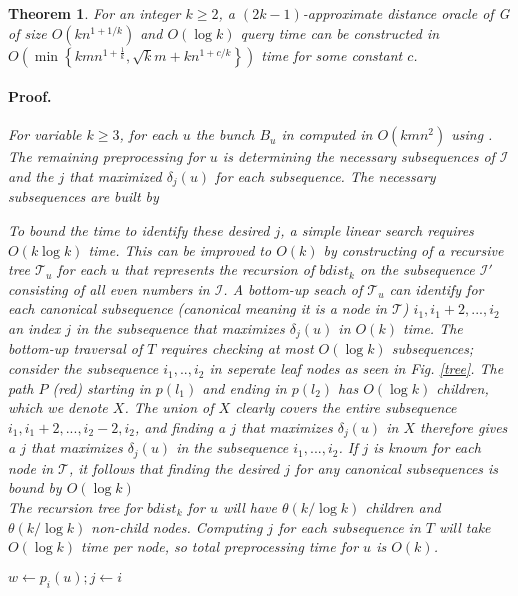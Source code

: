 \documentclass[12pt]{article}
\newtheorem{thm}{Theorem}[section]
\begin{document}
\begin{thm}
For an integer $k\geq 2$, a $(2k - 1)$-approximate distance oracle of G of size $O(kn^{1+1/k})$ and $O(\log k)$ query time can be constructed in $O\left( \min \left\lbrace kmn^{1+\frac{1}{k}}, \sqrt{k}m + kn^{1+c/k}\right\rbrace\right)$ time for some constant $c$.

\paragraph{Proof.} For variable $k\geq 3$, for each $u$ the bunch $B_u$ in computed in $O(kmn^{2})$ using \cite{Thorup2005}. The remaining preprocessing for $u$ is determining the necessary subsequences of $\mathcal{I}$ and the $j$ that maximized $\delta_j(u)$ for each subsequence.
The necessary subsequences are built by 

To bound the time to identify these desired $j$, a simple linear search requires $O(k\log k)$ time. This can be improved to $O(k)$ by constructing of a recursive tree $\mathcal{T}_u$ for each $u$ that represents the recursion of $bdist_k$ on the subsequence $\mathcal{I}'$ consisting of all even numbers in $\mathcal{I}$. A bottom-up seach of $\mathcal{T}_u$ can identify for each canonical subsequence (canonical meaning it is a node in $\mathcal{T}$) $i_1,i_1+2,...,i_2$ an index $j$ in the subsequence that maximizes $\delta_j(u)$ in $O(k)$ time. The bottom-up traversal of $T$ requires checking at most $O(\log k)$ subsequences; consider the subsequence $i_1,..,i_2$ in seperate leaf nodes as seen in Fig. \ref{tree}. The path $P$ (red) starting in $p(l_1)$ and ending in $p(l_2)$ has $O(\log k)$ children, which we denote $X$. The union of $X$ clearly covers the entire subsequence $i_1,i_1+2,...,i_2-2,i_2$, and finding a $j$ that maximizes $\delta_j(u)$ in $X$ therefore gives a $j$ that maximizes $\delta_j(u)$ in the subsequence $i_1,...,i_2$. If $j$ is known for each node in $\mathcal{T}$, it follows that finding the desired $j$ for any canonical subsequences is bound by $O(\log k)$\\

The recursion tree for $bdist_k$ for $u$ will have $\theta(k/\log k)$ children and $\theta(k/\log k)$ non-child nodes. Computing $j$ for each subsequence in $T$ will take $O(\log k)$ time per node, so total preprocessing time for $u$ is $O(k)$. 
\end{thm}

\begin{Walgo}[ht]{20pt}
  \DontPrintSemicolon
  \Indm
    \Indp
    \BlankLine
    $w \leftarrow p_i(u); j \leftarrow i$
    
    
    \caption{$dist_k(u,v,i)$}
    \label{alg:distk}
\end{Walgo}
\end{document}
